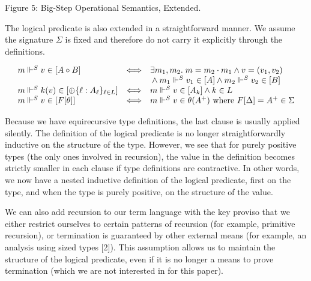 \documentclass[10pt,a4paper]{amsart}
\begin{document}
Figure 5: Big-Step Operational Semantics, Extended.\par
 
 
 
The logical predicate is also extended in a straightforward manner. We assume the signature $\Sigma$ is fixed and therefore do not carry it explicitly through the definitions.\par
  
\par  \quad  \[\begin{array}[]{lcl}m\Vdash^{S}v\in[A\mathbin{\circ}B]&\Longleftrightarrow&\exists m_{1},m_{2}.\;m=m_{2}\cdot m_{1}\land v=(v_{1},v_{2})\\
&&\hbox{}\land m_{1}\Vdash^{S}v_{1}\in[A]\land m_{2}\Vdash^{S}v_{2}\in[B]\\
m\Vdash^{S}k(v)\in[{\oplus}\{\ell:A_{\ell}\}_{\ell\in L}]&\Longleftrightarrow&m\Vdash^{S}v\in[A_{k}]\land k\in L\\
m\Vdash^{S}v\in[F[\theta]]&\Longleftrightarrow&m\Vdash^{S}v\in\theta(A^{+})\ \mbox{where $F[\Delta]=A^{+}\in\Sigma$}\end{array}\]\quad  \quad  
  
 
 
Because we have equirecursive type definitions, the last clause is usually applied silently. The definition of the logical predicate is no longer straightforwardly inductive on the structure of the type. However, we see that for purely positive types (the only ones involved in recursion), the value in the definition becomes strictly smaller in each clause if type definitions are contractive. In other words, we now have a nested inductive definition of the logical predicate, first on the type, and when the type is purely positive, on the structure of the value.\par
 
 
 
We can also add recursion to our term language with the key proviso that we either restrict ourselves to certain patterns of recursion (for example, primitive recursion), or termination is guaranteed by other external means (for example, an analysis using sized types [2]). This assumption allows us to maintain the structure of the logical predicate, even if it is no longer a means to prove termination (which we are not interested in for this paper).\par
 
\end{document}
